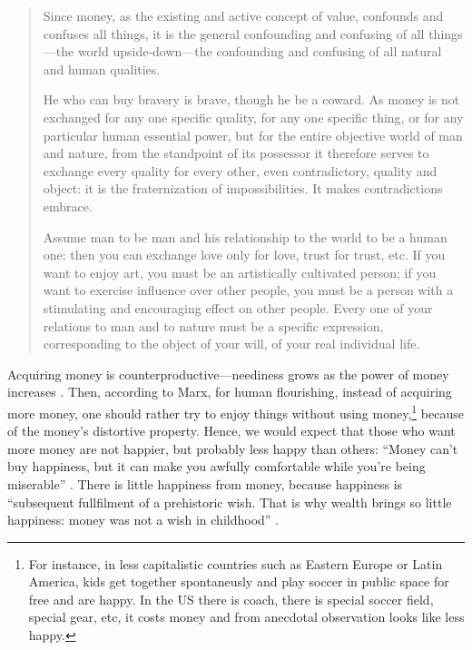 \documentclass[10pt, letterpaper]{article}
\begin{document}
\begin{spacing}{1.8}
\begin{quote}
Since money, as the existing and active concept of value, confounds and confuses all things, it is the general confounding and confusing of all things---the world upside-down---the confounding and confusing of all natural and human qualities.

He who can buy bravery is brave, though he be a coward. As money is not exchanged for any one specific quality, for any one specific thing, or for any particular human essential power, but for the entire objective world of man and nature, from the standpoint of its possessor it therefore serves to exchange every quality for every other, even contradictory, quality and object: it is the fraternization of impossibilities. It makes contradictions embrace.

Assume man to be man and his relationship to the world to be a human one: then you can exchange love only for love, trust for trust, etc. If you want to enjoy art, you must be an artistically cultivated person; if you want to exercise influence over other people, you must be a person with a stimulating and encouraging effect on other people. Every one of your relations to man and to nature must be a specific expression, corresponding to the object of your will, of your real individual life.
\end{quote}

Acquiring money is counterproductive---neediness grows as the power of money increases \citep{marx1844-human-requirements}.
%
Then, according to Marx, for human flourishing, instead of acquiring more money,
one should rather try to enjoy things without using money,\footnote{For
  instance, in less capitalistic countries such as Eastern Europe or Latin
  America, kids get together spontaneusly and play soccer in public space for
  free and are happy. In the US there is coach, there is special soccer field,
  special gear, etc, it costs money and from anecdotal observation looks like
  less happy.} because of the money's
distortive property. Hence, we would expect that those who want more money are
not happier, but probably less happy than others: ``Money can't buy happiness, but it can make you
awfully comfortable while you're being miserable'' \citep[][p.26]{pmunier2004being}. 
There is little  happiness from money, because happiness is ``subsequent fullfilment of a
  prehistoric wish. That is why wealth brings so little happiness: money was
  not a wish in childhood'' \citep[Freud cited in][p. 203]{marcuse15}.


\end{spacing}
\end{document}
